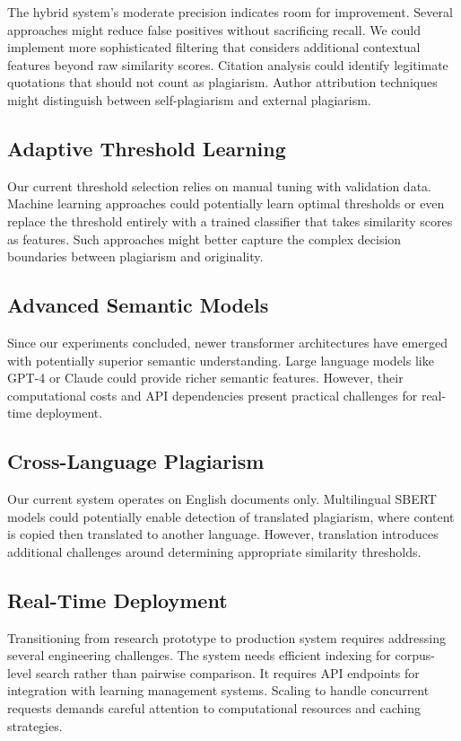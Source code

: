 \documentclass[conference]{IEEEtran}
\begin{document}
The hybrid system's moderate precision indicates room for improvement. Several approaches might reduce false positives without sacrificing recall. We could implement more sophisticated filtering that considers additional contextual features beyond raw similarity scores. Citation analysis could identify legitimate quotations that should not count as plagiarism. Author attribution techniques might distinguish between self-plagiarism and external plagiarism.

\subsection{Adaptive Threshold Learning}

Our current threshold selection relies on manual tuning with validation data. Machine learning approaches could potentially learn optimal thresholds or even replace the threshold entirely with a trained classifier that takes similarity scores as features. Such approaches might better capture the complex decision boundaries between plagiarism and originality.

\subsection{Advanced Semantic Models}

Since our experiments concluded, newer transformer architectures have emerged with potentially superior semantic understanding. Large language models like GPT-4 or Claude could provide richer semantic features. However, their computational costs and API dependencies present practical challenges for real-time deployment.

\subsection{Cross-Language Plagiarism}

Our current system operates on English documents only. Multilingual SBERT models could potentially enable detection of translated plagiarism, where content is copied then translated to another language. However, translation introduces additional challenges around determining appropriate similarity thresholds.

\subsection{Real-Time Deployment}

Transitioning from research prototype to production system requires addressing several engineering challenges. The system needs efficient indexing for corpus-level search rather than pairwise comparison. It requires API endpoints for integration with learning management systems. Scaling to handle concurrent requests demands careful attention to computational resources and caching strategies.
\end{document}
